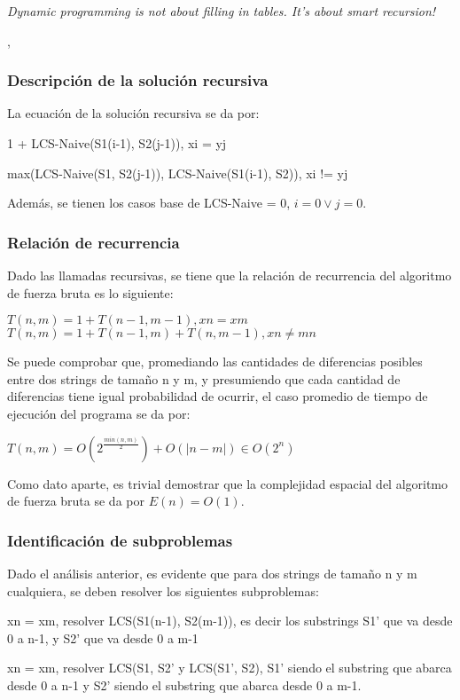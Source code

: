 
\epigraph{\textit{Dynamic programming is not about filling in tables. It's about smart recursion!}}{\citeauthor{algorithms_erickson}, \citeyear{algorithms_erickson} \cite{algorithms_erickson}}

\subsubsection{Descripción de la solución recursiva}

La ecuación de la solución recursiva se da por:

1 + LCS-Naive(S1(i-1), S2(j-1)), xi = yj

max(LCS-Naive(S1, S2(j-1)), LCS-Naive(S1(i-1), S2)), xi != yj

Además, se tienen los casos base de LCS-Naive = 0, $i = 0 \lor j = 0$.

\subsubsection{Relación de recurrencia}

Dado las llamadas recursivas, se tiene que la relación de recurrencia del algoritmo de fuerza bruta es lo siguiente:

$T(n, m) = 1 + T(n-1, m-1), xn = xm$
$T(n, m) = 1 + T(n-1, m) + T(n, m-1), xn \neq mn$

Se puede comprobar que, promediando las cantidades de diferencias posibles entre dos strings de tamaño n y m, y presumiendo que cada cantidad de diferencias tiene igual probabilidad de ocurrir, el caso promedio de tiempo de ejecución del programa se da por:

$T(n,m) = O(2^\frac{min(n,m)}{2}) + O(|n-m|) \in O(2^n)$

Como dato aparte, es trivial demostrar que la complejidad espacial del algoritmo de fuerza bruta se da por $E(n) = O(1)$.

\subsubsection{Identificación de subproblemas}

Dado el análisis anterior, es evidente que para dos strings de tamaño n y m cualquiera, se deben resolver los siguientes subproblemas:

xn = xm, resolver LCS(S1(n-1), S2(m-1)), es decir los substrings S1' que va desde 0 a n-1, y S2' que va desde 0 a m-1

xn = xm, resolver LCS(S1, S2' y LCS(S1', S2), S1' siendo el substring que abarca desde 0 a n-1 y S2' siendo el substring que abarca desde 0 a m-1.

